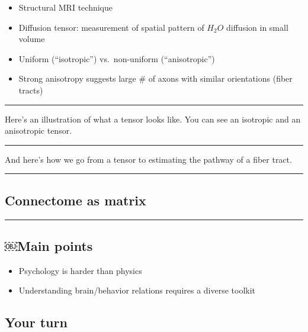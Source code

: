\documentclass[]{article}
\providecommand{\tightlist}{%
  \setlength{\itemsep}{0pt}\setlength{\parskip}{0pt}}
\begin{document}
\begin{itemize}
\tightlist
\item
  Structural MRI technique
\item
  Diffusion tensor: measurement of spatial pattern of \(H_2O\) diffusion
  in small volume
\item
  Uniform (``isotropic'') vs.~non-uniform (``anisotropic'')
\item
  Strong anisotropy suggests large \# of axons with similar orientations
  (fiber tracts)
\end{itemize}

\begin{center}\rule{0.5\linewidth}{\linethickness}\end{center}

Here's an illustration of what a tensor looks like. You can see an
isotropic and an anisotropic tensor.

\begin{center}\rule{0.5\linewidth}{\linethickness}\end{center}

And here's how we go from a tensor to estimating the pathway of a fiber
tract.

\begin{center}\rule{0.5\linewidth}{\linethickness}\end{center}

\subsection{Connectome as matrix}\label{connectome-as-matrix}

\begin{center}\rule{0.5\linewidth}{\linethickness}\end{center}

\subsection{￼Main points}\label{main-points}

\begin{itemize}
\tightlist
\item
  Psychology is harder than physics
\item
  Understanding brain/behavior relations requires a diverse toolkit
\end{itemize}

\subsection{Your turn}\label{your-turn}
\end{document}
